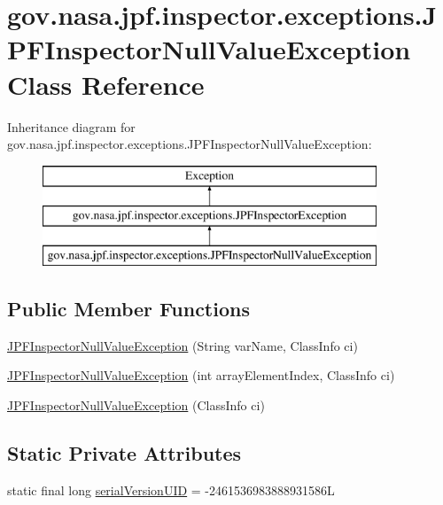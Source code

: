 \hypertarget{classgov_1_1nasa_1_1jpf_1_1inspector_1_1exceptions_1_1_j_p_f_inspector_null_value_exception}{}\section{gov.\+nasa.\+jpf.\+inspector.\+exceptions.\+J\+P\+F\+Inspector\+Null\+Value\+Exception Class Reference}
\label{classgov_1_1nasa_1_1jpf_1_1inspector_1_1exceptions_1_1_j_p_f_inspector_null_value_exception}
Inheritance diagram for gov.\+nasa.\+jpf.\+inspector.\+exceptions.\+J\+P\+F\+Inspector\+Null\+Value\+Exception\+:\begin{figure}[H]
\begin{center}
\leavevmode
\includegraphics[height=3.000000cm]{classgov_1_1nasa_1_1jpf_1_1inspector_1_1exceptions_1_1_j_p_f_inspector_null_value_exception}
\end{center}
\end{figure}
\subsection*{Public Member Functions}
\begin{DoxyCompactItemize}
\item 
\hyperlink{classgov_1_1nasa_1_1jpf_1_1inspector_1_1exceptions_1_1_j_p_f_inspector_null_value_exception_a1c49b892686c0747f385bada0557f99f}{J\+P\+F\+Inspector\+Null\+Value\+Exception} (String var\+Name, Class\+Info ci)
\item 
\hyperlink{classgov_1_1nasa_1_1jpf_1_1inspector_1_1exceptions_1_1_j_p_f_inspector_null_value_exception_adf24dca0531e6e895f1fc63e378aaf74}{J\+P\+F\+Inspector\+Null\+Value\+Exception} (int array\+Element\+Index, Class\+Info ci)
\item 
\hyperlink{classgov_1_1nasa_1_1jpf_1_1inspector_1_1exceptions_1_1_j_p_f_inspector_null_value_exception_a6ac6f3df73ec4fda19270c6e75ef81ed}{J\+P\+F\+Inspector\+Null\+Value\+Exception} (Class\+Info ci)
\end{DoxyCompactItemize}
\subsection*{Static Private Attributes}
\begin{DoxyCompactItemize}
\item 
static final long \hyperlink{classgov_1_1nasa_1_1jpf_1_1inspector_1_1exceptions_1_1_j_p_f_inspector_null_value_exception_aa604f576f6419c31ae42f5c42e6c2780}{serial\+Version\+U\+ID} = -\/2461536983888931586L
\end{DoxyCompactItemize}


